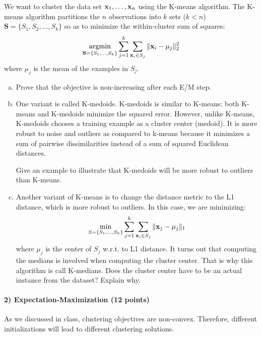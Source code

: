 \documentclass[11pt]{article}
\newcommand{\vx}{{\bf x}}
\newcommand{\vxi}{{\bf x}_i}
\begin{document}
We want to cluster the data set $\vx_1,\ldots,\vx_n$ using the K-means algorithm. The K-means algorithm partitions the $n$ observations into $k$ sets ($k < n$) $\mathbf{S} = \{S_1, S_2, \ldots, S_k\}$ so as to minimize the within-cluster sum of squares:
\begin{eqnarray*}
\mathop{\textrm{argmin}}_{\mathbf{S}=\{S_1,\ldots,S_k\}}\sum_{j=1}^k\sum_{\vxi\in S_j}\|\vx_i-\mu_j\|_2^2
\end{eqnarray*}
where $\mu_j$ is the mean of the examples in $S_j$.

\begin{enumerate}[(a)]
\item Prove that the objective is non-increasing after each E/M step.
\item One variant is called K-medoids. K-medoids is similar to K-means: both K-means and K-medoids minimize the squared error. However, unlike K-means, K-medoids chooses a training example as a cluster center (medoid). It is more robust to noise and outliers as compared to k-means because it minimizes a sum of pairwise dissimilarities instead of a sum of squared Euclidean distances. 

Give an example to illustrate that K-medoids will be more robust to outliers than K-means.
\item Another variant of K-means is to change the distance metric to the L1 distance, which is more robust to outliers. In this case, we are minimizing:
\begin{align}
\min_{S=\{S_1,...,S_k\}}\sum_{j=1}^k\sum_{\vxi\in S_j}\|\vx_j-\mu_j\|_1
\end{align}
where $\mu_j$ is the center of $S_j$ w.r.t. to L1 distance. It turns out that computing the medians is involved when computing the cluster center. That is why this algorithm is call K-medians. Does the cluster center have to be an actual instance from the dataset? Explain why.
\end{enumerate}
	
\paragraph{2) Expectation-Maximization (12 points)} 

As we discussed in class, clustering objectives are non-convex. Therefore, different initializations will lead to different clustering solutions.
\end{document}
